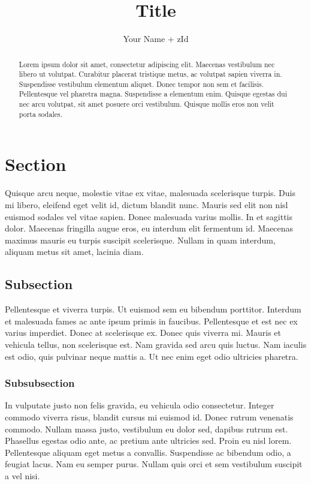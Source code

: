 \documentclass[fleqn,usenatbib]{mnras}
\title{Title}
\author{Your Name + zId}
\begin{document}
 
\label{firstpage}
\pagerange{\pageref{firstpage}--\pageref{lastpage}}
\maketitle

\begin{abstract}
Lorem ipsum dolor sit amet, consectetur adipiscing elit. Maecenas vestibulum nec libero ut volutpat. Curabitur placerat tristique metus, ac volutpat sapien viverra in. Suspendisse vestibulum elementum aliquet. Donec tempor non sem et facilisis. Pellentesque vel pharetra magna. Suspendisse a elementum enim. Quisque egestas dui nec arcu volutpat, sit amet posuere orci vestibulum. Quisque mollis eros non velit porta sodales. 
\end{abstract}

\section{Section}

Quisque arcu neque, molestie vitae ex vitae, malesuada scelerisque turpis. Duis mi libero, eleifend eget velit id, dictum blandit nunc. Mauris sed elit non nisl euismod sodales vel vitae sapien. Donec malesuada varius mollis. In et sagittis dolor. Maecenas fringilla augue eros, eu interdum elit fermentum id. Maecenas maximus mauris eu turpis suscipit scelerisque. Nullam in quam interdum, aliquam metus sit amet, lacinia diam. 
\subsection{Subsection}

Pellentesque et viverra turpis. Ut euismod sem eu bibendum porttitor. Interdum et malesuada fames ac ante ipsum primis in faucibus. Pellentesque et est nec ex varius imperdiet. Donec at scelerisque ex. Donec quis viverra mi. Mauris et vehicula tellus, non scelerisque est. Nam gravida sed arcu quis luctus. Nam iaculis est odio, quis pulvinar neque mattis a. Ut nec enim eget odio ultricies pharetra. 
\subsubsection{Subsubsection}

In vulputate justo non felis gravida, eu vehicula odio consectetur. Integer commodo viverra risus, blandit cursus mi euismod id. Donec rutrum venenatis commodo. Nullam massa justo, vestibulum eu dolor sed, dapibus rutrum est. Phasellus egestas odio ante, ac pretium ante ultricies sed. Proin eu nisl lorem. Pellentesque aliquam eget metus a convallis. Suspendisse ac bibendum odio, a feugiat lacus. Nam eu semper purus. Nullam quis orci et sem vestibulum suscipit a vel nisi. 

\label{lastpage}

 
\end{document}
